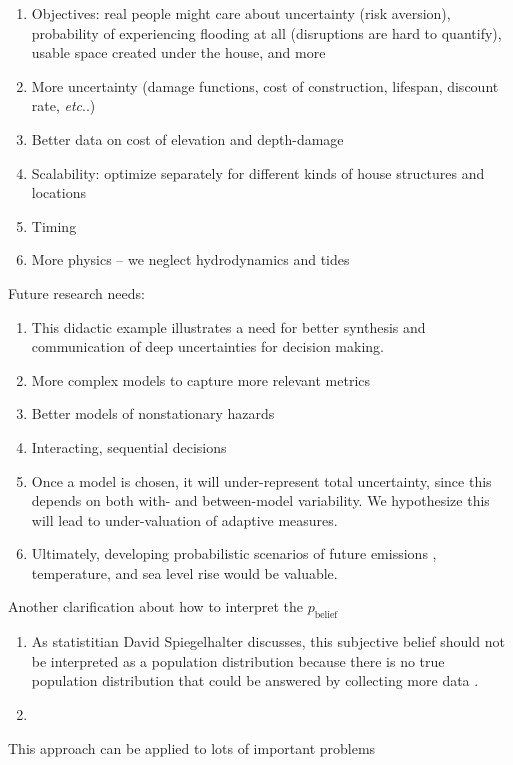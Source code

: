 \documentclass[12pt]{article}
\makeatletter
\newcommand{\james}[1]{\todo[color=giallo, textcolor=nero]{\textbf{ATTN James:~}#1}} %
\DeclareRobustCommand\onedot{\futurelet\@let@token\@onedot}
\def\@onedot{\ifx\@let@token.\else.\null\fi\xspace}
\def\etc{\emph{etc}\onedot} \def\vs{\emph{vs}\onedot}
\DeclareRobustCommand\onedot{\futurelet\@let@token\@onedot}
\def\@onedot{\ifx\@let@token.\else.\null\fi\xspace}
\def\etc{\emph{etc}\onedot} \def\vs{\emph{vs}\onedot}
\makeatother
\begin{document}
\begin{enumerate}
    \item Objectives: real people might care about uncertainty (risk aversion), probability of experiencing flooding at all (disruptions are hard to quantify), usable space created under the house, and more
    \item More uncertainty (damage functions, cost of construction, lifespan, discount rate, \etc)
    \item Better data on cost of elevation and depth-damage
    \item Scalability: optimize separately for different kinds of house structures and locations
    \item Timing
    \item More physics -- we neglect hydrodynamics and tides
\end{enumerate}
Future research needs:
\begin{enumerate}
    \item This didactic example illustrates a need for better synthesis and communication of deep uncertainties for decision making.
    \item More complex models to capture more relevant metrics
    \item Better models of nonstationary hazards
    \item Interacting, sequential decisions
    \item Once a model is chosen, it will under-represent total uncertainty, since this depends on both with- and between-model variability. We hypothesize this will lead to under-valuation of adaptive measures.
    \item Ultimately, developing probabilistic scenarios of future emissions \citep[as in][]{srikrishnan_probabilistic:2022}, temperature, and sea level rise would be valuable.
\end{enumerate}
Another clarification about how to interpret the $p_\mathrm{belief}$
\begin{enumerate}
    \item As statistitian David Spiegelhalter discusses, this subjective belief should not be interpreted as a population distribution because there is no true population distribution that could be answered by collecting more data \citep{andorra_spiegelhalter:2021}.\james{Contextualize this}
    \item
\end{enumerate}
This approach can be applied to lots of important problems
\end{document}
